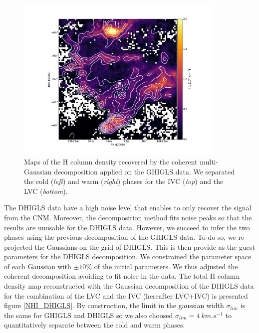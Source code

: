 \documentclass[traditabstract]{aa}
\begin{document}
\begin{figure}[h]
  \hspace{3mm}
  \includegraphics[page=5,height=8cm,trim=110 35 130 75,clip=true]{Figures/GHIGLS_NHI.pdf}
  \caption{\label{Phases_GHIGLS} Maps of the H column density recovered by the coherent multi-Gaussian decomposition applied on the GHIGLS data. We separated the cold (\emph{left}) and warm (\emph{right}) phases for the IVC (\emph{top}) and the LVC (\emph{bottom}).}
\end{figure}

   The DHIGLS data have a high noise level that enables to only recover the signal from the CNM. Moreover, the decomposition method fits noise peaks so that the results are unusable for the DHIGLS data. However, we succeed to infer the two phases using the previous decomposition of the GHIGLS data. To do so, we re-projected the Gaussians on the grid of DHIGLS. This is then provide as the guest parameters for the DHIGLS decomposition. We constrained the parameter space of each Gaussian with $\pm 10\%$ of the initial parameters.
We thus adjusted the coherent decomposition avoiding to fit noise in the data. The total H column density map reconstructed with the Gaussian decomposition of the DHIGLS data for the combination of the LVC and the IVC (hereafter LVC+IVC) is presented figure \ref{NHI_DHIGLS}. By construction, the limit in the gaussian width $\sigma_{lim}$ is the same for GHIGLS and DHIGLS so we also choosed $\sigma_{lim}=4\: km.s^{-1}$ to quantitatively separate between the cold and warm phases.

\end{document}
